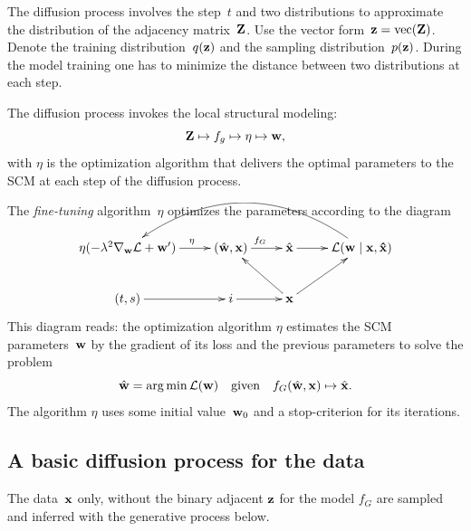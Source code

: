 \documentclass[12pt]{article}
\begin{document}
The diffusion process involves the step~$t$ and two distributions to approximate the distribution of 
the adjacency matrix~$\mathbf{Z}$.
Use the vector form~$\mathbf{z} = \text{vec}(\mathbf{Z})$.
Denote the training distribution~$q(\mathbf{z})$ and the sampling distribution~$p(\mathbf{z})$.
During the model training one has to minimize the distance between two distributions at each step. 

The diffusion process invokes the local structural modeling:
\[
\mathbf{Z} \mapsto f_g \mapsto \eta \mapsto \mathbf{w},
\]
with $\eta$ is the optimization algorithm that delivers the optimal parameters to the SCM at each step of the diffusion process.

The \emph{fine-tuning} algorithm~$\eta$ optimizes the parameters according to the diagram

\begin{equation*}
\xymatrix{
\eta(-\lambda^2\nabla_{\textbf{w}}\loss+\textbf{w}^\prime)\ar[r]^{\qquad \eta} & (\hat{\bw}, {\bx}) \ar[r]^{f_G} &  \hat{\bx}\ar[r] & \loss(\mathbf{\textbf{w}\mid\bx,\hat{\bx}}) \ar@/_3pc/[lll]\\
(t,s)\ar[r] & i\ar[r] & \bx\ar[ul]\ar[ur] & }
\end{equation*}
This diagram reads: the optimization algorithm $\eta$ estimates the SCM parameters~$\mathbf{w}$ by the gradient of its loss and the previous parameters to solve the problem 
\begin{equation*}
\hat{\textbf{w}}= \arg\min \mathcal{L}(\mathbf{w}) \quad\text{given}\quad f_G(\hat{\mathbf{w}},\mathbf{x})\mapsto \hat{\mathbf{x}}.
\end{equation*}  
The algorithm $\eta$ uses some initial value~$\mathbf{w}_0$ and a stop-criterion for its iterations.

\subsection*{A basic diffusion process for the data}
The data~$\mathbf{x}$ only, without the binary adjacent $\mathbf{z}$ for the model $f_G$ are sampled and inferred with the generative process below.
\end{document}
